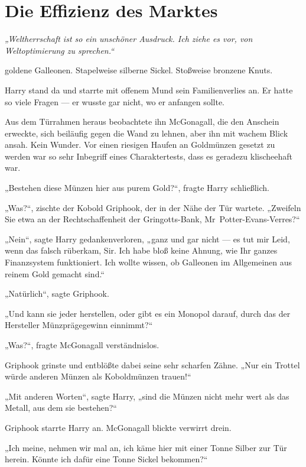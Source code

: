 \chapter{Die Effizienz des Marktes}

\emph{„Weltherrschaft ist so ein unschöner Ausdruck. Ich ziehe es vor, von Weltoptimierung zu sprechen.“}

\later

 goldene Galleonen. Stapelweise silberne Sickel. Stoßweise bronzene Knuts. 

\hplettrineextrapara
Harry stand da und starrte mit offenem Mund sein Familienverlies an. Er hatte so viele Fragen — er wusste gar nicht, wo er anfangen sollte.

Aus dem Türrahmen heraus beobachtete ihn McGonagall, die den Anschein erweckte, sich beiläufig gegen die Wand zu lehnen, aber ihn mit wachem Blick ansah. Kein Wunder. Vor einen riesigen Haufen an Goldmünzen gesetzt zu werden war so sehr Inbegriff eines Charaktertests, dass es geradezu klischeehaft war.

„Bestehen diese Münzen hier aus purem Gold?“, fragte Harry schließlich.

„Was?“, zischte der Kobold Griphook, der in der Nähe der Tür wartete. „Zweifeln Sie etwa an der Rechtschaffenheit der Gringotts-Bank, Mr~Potter-Evans-Verres?“

„Nein“, sagte Harry gedankenverloren, „ganz und gar nicht — es tut mir Leid, wenn das falsch rüberkam, Sir. Ich habe bloß keine Ahnung, wie Ihr ganzes Finanzsystem funktioniert. Ich wollte wissen, ob Galleonen im Allgemeinen aus reinem Gold gemacht sind.“

„Natürlich“, sagte Griphook.

„Und kann sie jeder herstellen, oder gibt es ein Monopol darauf, durch das der Hersteller Münzprägegewinn einnimmt?“

„Was?“, fragte McGonagall verständnislos. 

Griphook grinste und entblößte dabei seine sehr scharfen Zähne. „Nur ein Trottel würde anderen Münzen als Koboldmünzen trauen!“

„Mit anderen Worten“, sagte Harry, „sind die Münzen nicht mehr wert als das Metall, aus dem sie bestehen?“

Griphook starrte Harry an. McGonagall blickte verwirrt drein.

„Ich meine, nehmen wir mal an, ich käme hier mit einer Tonne Silber zur Tür herein. Könnte ich dafür eine Tonne Sickel bekommen?“

